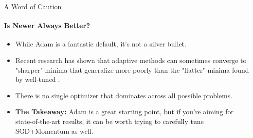 \begin{frame}{A Word of Caution}
    \framesubtitle{Is Newer Always Better?}
    \begin{itemize}
        \item While Adam is a fantastic default, it's not a silver bullet.
        \item Recent research has shown that adaptive methods can sometimes converge to "sharper" minima that generalize more poorly than the "flatter" minima found by well-tuned .
        \item There is no single optimizer that dominates across all possible problems.
        \item \textbf{The Takeaway:} Adam is a great starting point, but if you're aiming for state-of-the-art results, it can be worth trying to carefully tune SGD+Momentum as well.
    \end{itemize}
\end{frame}
